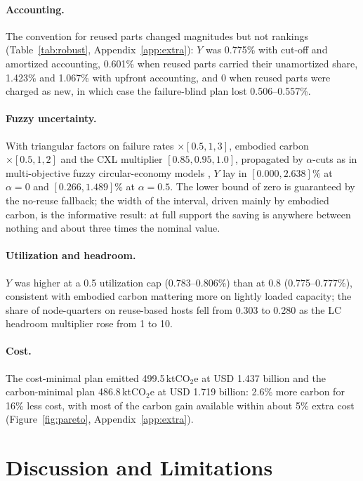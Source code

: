 \documentclass[11pt]{article}
\begin{document}
\paragraph{Accounting.} The convention for reused parts changed magnitudes but not rankings (Table~\ref{tab:robust}, Appendix~\ref{app:extra}): $Y$ was 0.775\% with cut-off and amortized accounting, 0.601\% when reused parts carried their unamortized share, 1.423\% and 1.067\% with upfront accounting, and 0 when reused parts were charged as new, in which case the failure-blind plan lost 0.506--0.557\%. 

\paragraph{Fuzzy uncertainty.} With triangular factors on failure rates $\times[0.5,1,3]$, embodied carbon $\times[0.5,1,2]$ and the CXL multiplier $[0.85,0.95,1.0]$, propagated by $\alpha$-cuts \citep{zadeh1965fuzzy} as in multi-objective fuzzy circular-economy models \citep{poonia2024circular}, $Y$ lay in $[0.000,2.638]\%$ at $\alpha=0$ and $[0.266,1.489]\%$ at $\alpha=0.5$. The lower bound of zero is guaranteed by the no-reuse fallback; the width of the interval, driven mainly by embodied carbon, is the informative result: at full support the saving is anywhere between nothing and about three times the nominal value. 

\paragraph{Utilization and headroom.} $Y$ was higher at a 0.5 utilization cap (0.783--0.806\%) than at 0.8 (0.775--0.777\%), consistent with embodied carbon mattering more on lightly loaded capacity; the share of node-quarters on reuse-based hosts fell from 0.303 to 0.280 as the LC headroom multiplier rose from 1 to 10. 

\paragraph{Cost.} The cost-minimal plan emitted 499.5\,ktCO$_2$e at USD 1.437 billion and the carbon-minimal plan 486.8\,ktCO$_2$e at USD 1.719 billion: 2.6\% more carbon for 16\% less cost, with most of the carbon gain available within about 5\% extra cost (Figure~\ref{fig:pareto}, Appendix~\ref{app:extra}).

\section{Discussion and Limitations}
\label{sec:discussion}
\end{document}
